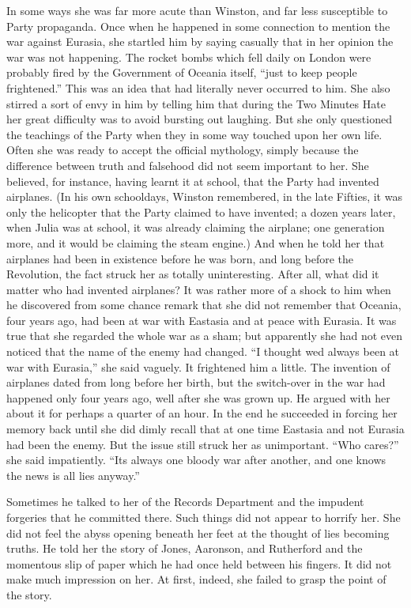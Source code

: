 In some ways she was far more acute than Winston, and far less
susceptible to Party propaganda. Once when he happened in some
connection to mention the war against Eurasia, she startled him by
saying casually that in her opinion the war was not happening. The
rocket bombs which fell daily on London were probably fired by the
Government of Oceania itself, ``just to keep people frightened.'' This was
an idea that had literally never occurred to him. She also stirred a
sort of envy in him by telling him that during the Two Minutes Hate her
great difficulty was to avoid bursting out laughing. But she only
questioned the teachings of the Party when they in some way touched upon
her own life. Often she was ready to accept the official mythology,
simply because the difference between truth and falsehood did not seem
important to her. She believed, for instance, having learnt it at
school, that the Party had invented airplanes. (In his own schooldays,
Winston remembered, in the late Fifties, it was only the helicopter that
the Party claimed to have invented; a dozen years later, when Julia was
at school, it was already claiming the airplane; one generation more,
and it would be claiming the steam engine.) And when he told her that
airplanes had been in existence before he was born, and long before the
Revolution, the fact struck her as totally uninteresting. After all,
what did it matter who had invented airplanes? It was rather more of a
shock to him when he discovered from some chance remark that she did not
remember that Oceania, four years ago, had been at war with Eastasia and
at peace with Eurasia. It was true that she regarded the whole war as a
sham; but apparently she had not even noticed that the name of the enemy
had changed. ``I thought we\textquotesingle d always been at war with
Eurasia,'' she said vaguely. It frightened him a little. The invention of
airplanes dated from long before her birth, but the switch-over in the
war had happened only four years ago, well after she was grown up. He
argued with her about it for perhaps a quarter of an hour. In the end he
succeeded in forcing her memory back until she did dimly recall that at
one time Eastasia and not Eurasia had been the enemy. But the issue
still struck her as unimportant. ``Who cares?'' she said impatiently.
``It\textquotesingle s always one bloody war after another, and one knows
the news is all lies anyway.''

Sometimes he talked to her of the Records Department and the impudent
forgeries that he committed there. Such things did not appear to horrify
her. She did not feel the abyss opening beneath her feet at the thought
of lies becoming truths. He told her the story of Jones, Aaronson, and
Rutherford and the momentous slip of paper which he had once held
between his fingers. It did not make much impression on her. At first,
indeed, she failed to grasp the point of the story.

